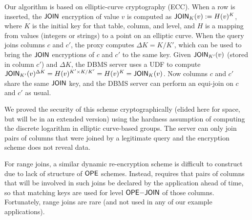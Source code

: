 Our algorithm is based on elliptic-curve cryptography (ECC).  When a
row is inserted, the $\mathsf{JOIN}$ encryption of value $v$ is computed as
$\mathsf{JOIN}_K(v) := H(v)^K$, where $K$ is the initial key for that table,
column, and level, and $H$ is a mapping from values (integers or
strings) to a point on an elliptic curve.  When the query joins columns $c$ and
$c'$, the proxy computes $\Delta K=K/K'$, which can be used to bring
the $\mathsf{JOIN}$ encryptions of $c$ and $c'$ to the same key.  Given
$\mathsf{JOIN}_{K'}(v)$ (stored in column $c'$) and $\Delta K$, the DBMS
server uses a UDF to compute $\mathsf{JOIN}_{K'}(v)^{\Delta K} =
H(v)^{K'\times K / K'} = H(v)^K = \mathsf{JOIN}_K(v)$.  Now columns $c$ and
$c'$ share the same $\mathsf{JOIN}$ key, and the DBMS server can perform an
equi-join on $c$ and $c'$ as usual.

We proved the security of this scheme cryptographically (elided here
for space, but will be in an extended version) using the hardness
assumption of computing the discrete logarithm in elliptic curve-based
groups. The server can only join pairs of columns that were joined by
a legitimate query and the encryption scheme does not reveal data.


For range joins, a similar dynamic re-encryption scheme is difficult
to construct due to lack of structure of $\mathsf{OPE}$ schemes.  Instead,
\name{} requires that pairs of columns that will be involved in such
joins be declared by the application ahead of time, so that matching
keys are used for level $\mathsf{OPE}\mathrm{-}\mathsf{JOIN}$ of those columns.  Fortunately,
range joins are rare (and not used in any of our example
applications).

